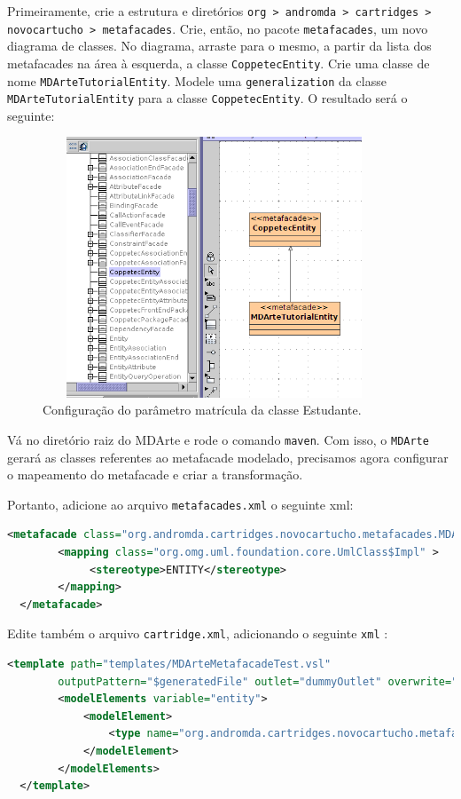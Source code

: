 Primeiramente, crie a estrutura e diretórios \texttt{org > andromda >
cartridges > novocartucho > metafacades}. Crie, então, no pacote
\texttt{metafacades}, um novo diagrama de classes. No diagrama, arraste para o
mesmo, a partir da lista dos metafacades na área à esquerda, a classe
\texttt{CoppetecEntity}. Crie uma classe de nome \texttt{MDArteTutorialEntity}.
Modele uma \texttt{generalization} da classe \texttt{MDArteTutorialEntity} para
a classe \texttt{CoppetecEntity}. O resultado será o seguinte:

\begin{figure}[H]
	\centering
	\includegraphics[width=290pt,height=220pt]{files/imgs/mdarte-novocartucho-metafacade-00.png}
	\caption{Configuração do parâmetro matrícula da classe Estudante.}
	\label{config_parametro}
\end{figure}

Vá no diretório raiz do MDArte e rode o comando \texttt{maven}. Com isso, o
\texttt{MDArte} gerará as classes referentes ao metafacade modelado, precisamos
agora configurar o mapeamento do metafacade e criar a transformação.

Portanto, adicione ao arquivo \texttt{metafacades.xml} o seguinte xml:

\begin{lstlisting}[language=xml,
frame=single]
  <metafacade class="org.andromda.cartridges.novocartucho.metafacades.MDArteTutorialEntityLogicImpl">
        <mapping class="org.omg.uml.foundation.core.UmlClass$Impl" >
        	 <stereotype>ENTITY</stereotype>
        </mapping>
  </metafacade>
\end{lstlisting}

Edite também o arquivo \texttt{cartridge.xml}, adicionando o seguinte
\texttt{xml} :

\begin{lstlisting}[language=xml,
frame=single]
  <template path="templates/MDArteMetafacadeTest.vsl"
		outputPattern="$generatedFile" outlet="dummyOutlet" overwrite="true">
		<modelElements variable="entity">
            <modelElement>
                <type name="org.andromda.cartridges.novocartucho.metafacades.MDArteTutorialEntityLogicImpl" />
            </modelElement>
        </modelElements>
  </template>
\end{lstlisting}

